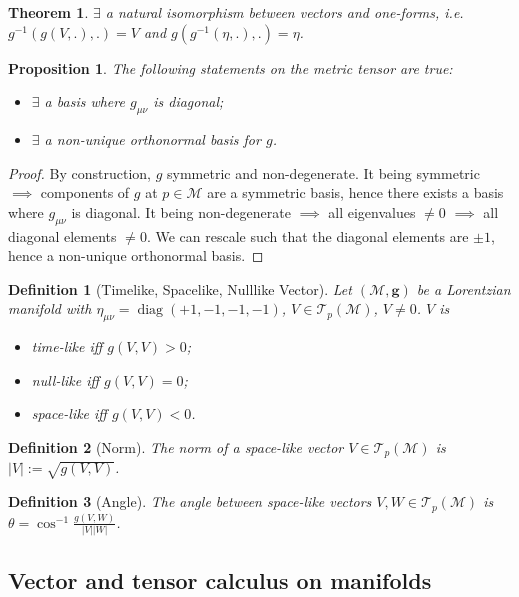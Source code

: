 \documentclass[a4paper]{article}
\DeclareMathOperator{\diag}{diag}
\theoremstyle{new}
\newtheorem{defi}{Definition}[section]
\newtheorem{thm}{Theorem}[section]
\newtheorem{prop}{Proposition}[section]
\begin{document}
\begin{thm}
$\exists$ a natural isomorphism between vectors and one-forms, i.e. $g^{-1}(g(V,.),.)=V$ and $g(g^{-1}(\eta,.),.)=\eta$.
\end{thm}
\begin{prop}
The following statements on the metric tensor are true:
\begin{itemize}
    \item $\exists$ a basis where $g_{\mu\nu}$ is diagonal;
    \item $\exists$ a non-unique orthonormal basis for $g$.
\end{itemize}
\end{prop}
\begin{proof}
By construction, $g$ symmetric and non-degenerate. It being symmetric $\implies$ components of $g$ at $p\in\mathcal{M}$ are a symmetric basis, hence there exists a basis where $g_{\mu\nu}$ is diagonal. It being non-degenerate $\implies$ all eigenvalues $\neq0$ $\implies$ all diagonal elements $\neq 0$. We can rescale such that the diagonal elements are $\pm1$, hence a non-unique orthonormal basis. 
\end{proof}
\begin{defi}[Timelike, Spacelike, Nulllike Vector]
Let $(\mathcal{M},\mathbf{g})$ be a Lorentzian manifold with $\eta_{\mu\nu}=\diag(+1,-1,-1,-1)$, $V\in\mathcal{T}_p(\mathcal{M})$, $V\neq0$. $V$ is
\begin{itemize}
    \item time-like iff $g(V,V)>0$;
    \item null-like iff $g(V,V)=0$;
    \item space-like iff
    $g(V,V)<0$.
\end{itemize}
\end{defi}
\begin{defi}[Norm]
The norm of a space-like vector $V\in\mathcal{T}_p(\mathcal{M})$ is $|V|:=\sqrt{g(V,V)}$.
\end{defi}
\begin{defi}[Angle]
The angle between space-like vectors $V,W\in\mathcal{T}_p(\mathcal{M})$ is $\theta=\cos^{-1}\frac{g(V,W)}{|V||W|}$.
\end{defi}
\subsection{Vector and tensor calculus on manifolds}
\end{document}
